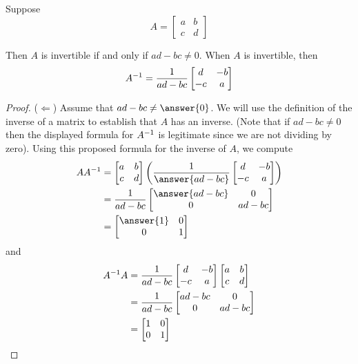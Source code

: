 \documentclass{ximera}
\begin{document}
\begin{theorem}
\label{theorem:TTMI}

Suppose
\[
  A=
  \begin{bmatrix}
    a&b\\
    c&d
  \end{bmatrix}
\]

Then $A$ is invertible if and only if $ad-bc\neq 0$.  When $A$ is invertible, then
\[
  A^{-1}=\frac{1}{ad-bc}
  \begin{bmatrix}
    d&-b\\
    -c&a
  \end{bmatrix}
\]

\begin{proof}
  ($\Leftarrow$) Assume that $ad-bc\neq \answer{0}$.  We will use the
  definition of the inverse of a matrix to establish that $A$ has an
  inverse.  (Note that if $ad-bc\neq 0$ then the displayed formula for
  $A^{-1}$ is legitimate since we are not dividing by zero).
  Using this proposed formula for the inverse of $A$, we compute
  \begin{align*}
    A\inverse{A}
    &=
      \begin{bmatrix}a&b\\c&d\end{bmatrix}
                             \left(\frac{1}{\answer{ad-bc}}
                             \begin{bmatrix}d&-b\\-c&a\end{bmatrix}
                                                      \right) \\
    &=
      \frac{1}{ad-bc}
      \begin{bmatrix}\answer{ad-bc}&0\\0&ad-bc\end{bmatrix} \\
    &= \begin{bmatrix}\answer{1}&0\\0&1\end{bmatrix}\\
  \end{align*}
  and
  \begin{align*}
    A^{-1}A
    &=
      \frac{1}{ad-bc}
      \begin{bmatrix}d&-b\\-c&a\end{bmatrix}
                               \begin{bmatrix}a&b\\c&d\end{bmatrix} \\
                                                      &=
                                                      \frac{1}{ad-bc}
\begin{bmatrix}ad-bc&0\\0&ad-bc\end{bmatrix} \\
    &=
      \begin{bmatrix}1&0\\0&1\end{bmatrix}
  \end{align*}


\end{proof}
\end{theorem}
\end{document}
